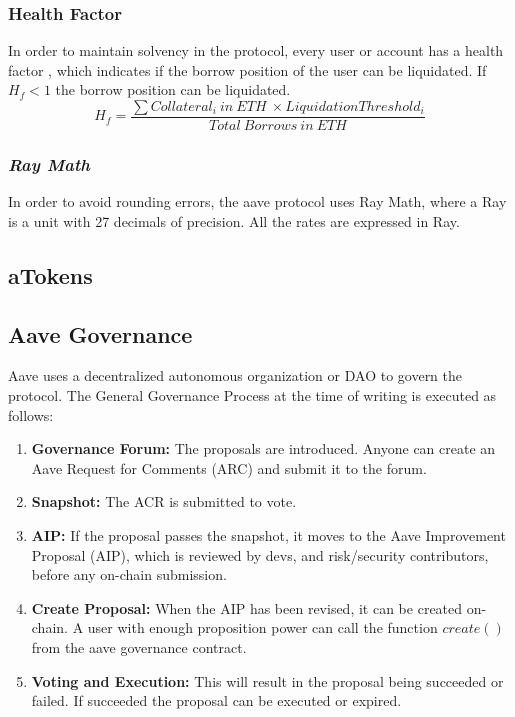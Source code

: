 \documentclass[11pt,a4paper]{report}
\begin{document}
\subsubsection{Health Factor}\label{hf}
In order to maintain solvency in the protocol, every user or account has a health factor\cite{aaveV1}\cite{risk} , which indicates if the borrow position of the user can be liquidated. If~$H_{f} < 1$ the borrow position can be liquidated.
\[ H_{f} = \frac{\sum Collateral_{i}~in~ETH~\times Liquidation Threshold_{i}}{Total~Borrows~in~ETH} \]

\subsubsection{\textit{Ray Math}}\label{ray}
In order to avoid rounding errors, the aave protocol uses Ray Math\cite{ray}\cite{ray2}, where a Ray is a unit with 27 decimals of precision. All the rates are expressed in Ray.
\subsection{aTokens}\label{atokens}
\subsection{Aave Governance}\label{governance}
Aave\cite{aaveV1GOV} uses a decentralized autonomous organization or DAO\cite{wiki:Dao} to govern the protocol. The General Governance Process\cite{gov} at the time of writing is executed as follows:
\begin{enumerate}
	\item \textbf{Governance Forum\cite{govForum}:} The proposals are introduced. Anyone can create an Aave Request for Comments (ARC)\cite{arc} and submit it to the forum.
	\item \textbf{Snapshot\cite{snapshot}:} The ACR is submitted to vote.
	\item \textbf{AIP:} If the proposal passes the snapshot, it moves to the Aave Improvement Proposal (AIP), which is reviewed by devs, and risk/security contributors, before any on-chain submission.
	\item \textbf{Create Proposal:} When the AIP has been revised, it can be created on-chain. A user with enough proposition power can call the function $create()$\cite{create} from the aave governance contract.
	\item \textbf{Voting and Execution:} This will result in the proposal being succeeded or failed. If succeeded the proposal can be executed or expired.
\end{enumerate}
\end{document}

